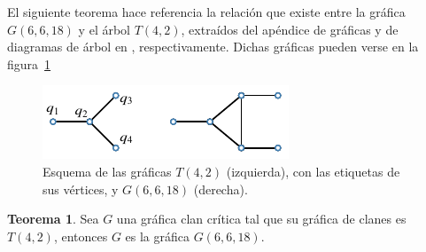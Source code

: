 \documentclass[12pt]{book}
\theoremstyle{definition}
\newtheorem{theorem}{Teorema}[chapter]
\begin{document}
El siguiente teorema hace referencia la relación que existe entre la gráfica $G(6,6,18)$ y el árbol $T(4,2)$, extraídos del apéndice de gráficas y de diagramas de árbol en \cite{Harary:1969}, respectivamente. Dichas gráficas pueden verse en la figura~\ref{F8}

\begin{figure}[!htbp]
	\centering
	\includegraphics[scale=1.2]{Fig7.pdf}
	\caption{Esquema de las gráficas $T(4,2)$ (izquierda), con las etiquetas de sus vértices, y $G(6,6,18)$ (derecha).\label{F8}}
\end{figure}

\begin{theorem}
Sea $G$ una gráfica clan crítica tal que su gráfica de clanes es $T(4,2)$, entonces $G$ es la gráfica $G(6,6,18)$.
\end{theorem}
\end{document}
